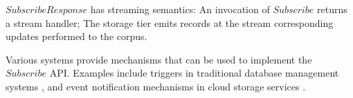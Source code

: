 $SubscribeResponse$ has streaming semantics:
An invocation of $Subscribe$ returns a stream handler;
The storage tier emits records at the stream corresponding updates performed to the corpus.

Various systems provide mechanisms that can be used to implement the $Subscribe$ API.
Examples include triggers in traditional database management systems \cite{mariadb:triggers}, and event notification
mechanisms in cloud storage services \cite{awss3:notifications}.








